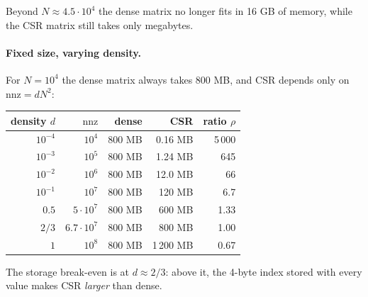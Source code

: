 \documentclass[11pt,a4paper]{article}
\newcommand{\nnz}{\mathrm{nnz}}
\begin{document}
\noindent Beyond
$N \approx 4.5 \cdot 10^4$ the dense matrix no longer fits in 16 GB of memory,
while the CSR matrix still takes only megabytes.

\paragraph{Fixed size, varying density.}
For $N = 10^4$ the dense matrix always takes 800 MB, and CSR depends only on
$\nnz = d N^2$:

\begin{center}
\begin{tabular}{rrrrr}
\toprule
density $d$ & $\nnz$ & dense & CSR & ratio $\rho$ \\
\midrule
$10^{-4}$ & $10^4$ & 800 MB & 0.16 MB & 5\,000 \\
$10^{-3}$ & $10^5$ & 800 MB & 1.24 MB & 645 \\
$10^{-2}$ & $10^6$ & 800 MB & 12.0 MB & 66 \\
$10^{-1}$ & $10^7$ & 800 MB & 120 MB & 6.7 \\
$0.5$     & $5 \cdot 10^7$ & 800 MB & 600 MB & 1.33 \\
$2/3$     & $6.7 \cdot 10^7$ & 800 MB & 800 MB & 1.00 \\
$1$       & $10^8$ & 800 MB & 1\,200 MB & 0.67 \\
\bottomrule
\end{tabular}
\end{center}

\noindent The storage break-even is at $d \approx 2/3$: above it, the 4-byte
index stored with every value makes CSR \emph{larger} than dense.
\end{document}
